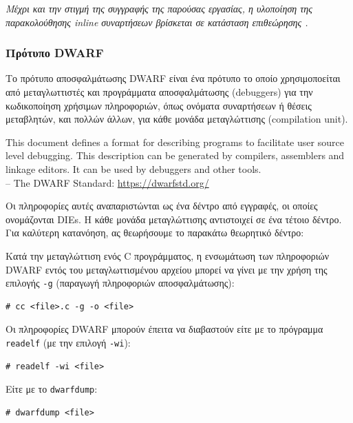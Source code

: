 \documentclass[12pt]{article}
\begin{document}
\textit{
	Μέχρι και την στιγμή της συγγραφής της παρούσας εργασίας, η υλοποίηση
	της παρακολούθησης inline συναρτήσεων βρίσκεται σε κατάσταση
	επιθεώρησης \cite{inlinepatch}.
}

\subsubsection{Πρότυπο DWARF} \label{dwarf}

Το πρότυπο αποσφαλμάτωσης DWARF \cite{dwarfstd} είναι ένα πρότυπο το οποίο
χρησιμοποείται από μεταγλωττιστές και προγράμματα αποσφαλμάτωσης (debuggers)
για την κωδικοποίηση χρήσιμων πληροφοριών, όπως ονόματα συναρτήσεων ή θέσεις
μεταβλητών, και πολλών άλλων, για κάθε μονάδα μεταγλώττισης (compilation unit).

\begin{displayquote}
	This document defines a format for describing programs to facilitate
	user source level debugging. This description can be generated by
	compilers, assemblers and linkage editors. It can be used by debuggers
	and other tools. \\

	-- The DWARF Standard:
	\href{https://dwarfstd.org/}{https://dwarfstd.org/}
\end{displayquote}

Οι πληροφορίες αυτές αναπαριστώνται ως ένα δέντρο από εγγραφές, οι οποίες
ονομάζονται DIEs. Η κάθε μονάδα μεταγλώττισης αντιστοιχεί σε ένα τέτοιο δέντρο.
Για καλύτερη κατανόηση, ας θεωρήσουμε το παρακάτω θεωρητικό δέντρο:

Κατά την μεταγλώττιση ενός C προγράμματος, η ενσωμάτωση των πληροφοριών DWARF
εντός του μεταγλωττισμένου αρχείου μπορεί να γίνει με την χρήση της επιλογής
\lstinline{-g} (παραγωγή πληροφοριών αποσφαλμάτωσης):

\begin{lstlisting}
# cc <file>.c -g -o <file>
\end{lstlisting}

Οι πληροφορίες DWARF μπορούν έπειτα να διαβαστούν είτε με το πρόγραμμα
\lstinline{readelf} (με την επιλογή \lstinline{-wi}):

\begin{lstlisting}
# readelf -wi <file>
\end{lstlisting}

Είτε με το \lstinline{dwarfdump}:

\begin{lstlisting}
# dwarfdump <file>
\end{lstlisting}
\end{document}
